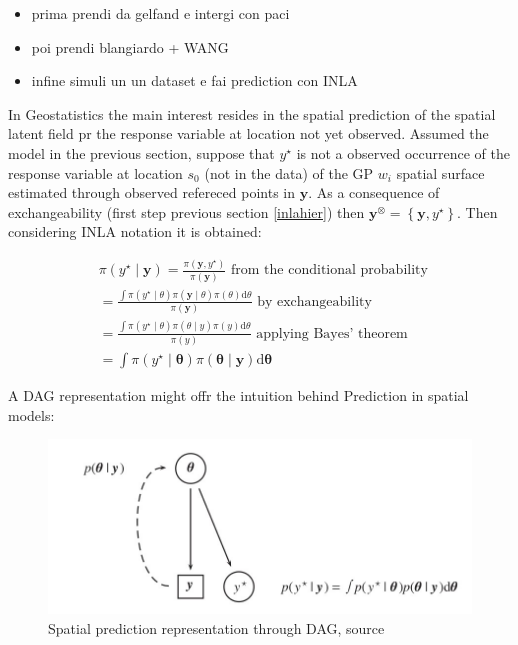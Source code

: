 \documentclass[
  12pt,
  a4paper,
  oneside]{book}
\providecommand{\tightlist}{%
  \setlength{\itemsep}{0pt}\setlength{\parskip}{0pt}}
\theoremstyle{definition}
\theoremstyle{definition}
\theoremstyle{definition}
\theoremstyle{remark}
\begin{document}
\begin{itemize}
\tightlist
\item
  prima prendi da gelfand e intergi con paci
\item
  poi prendi blangiardo + WANG
\item
  infine simuli un un dataset e fai prediction con INLA
\end{itemize}

In Geostatistics the main interest resides in the spatial prediction of the spatial latent field pr the response variable at location not yet observed.
Assumed the model in the previous section, suppose that \(y^{\star}\) is not a observed occurrence of the response variable at location \(s_{0}\) (not in the data) of the GP \(w_{i}\) spatial surface estimated through observed refereced points in \(\boldsymbol{y}\). As a consequence of exchangeability (first step previous section \ref{inlahier}) then \(\boldsymbol{y}^{\otimes}=\left\{\boldsymbol{y}, y^{\star}\right\}\). Then considering INLA notation it is obtained:

\[
\begin{aligned}
&\pi\left(y^{\star} \mid \boldsymbol{y}\right)=\frac{\pi\left(\boldsymbol{y}, y^{\star}\right)}{\pi(\boldsymbol{y})} \text { from the conditional probability }\\
&=\frac{\int \pi\left(y^{\star} \mid \theta\right) \pi(\boldsymbol{y} \mid \theta) \pi(\theta) \mathrm{d} \theta}{\pi(\boldsymbol{y})} \text { by exchangeability }\\
&=\frac{\int \pi\left(y^{\star} \mid \theta\right) \pi(\theta \mid y) \pi(y) \mathrm{d} \theta}{\pi(y)} \text { applying Bayes' theorem }\\
&=\int \pi\left(y^{\star} \mid \boldsymbol{\theta}\right) \pi(\boldsymbol{\theta} \mid \boldsymbol{y}) \mathrm{d} \boldsymbol{\theta}
\end{aligned}
\]

A DAG representation might offr the intuition behind Prediction in spatial models:

\begin{figure}
\centering
\includegraphics{images/spatial_prediction.jpg}
\caption{Spatial prediction representation through DAG, source \citet{Blangiardo-Cameletti}}
\end{figure}
\end{document}
